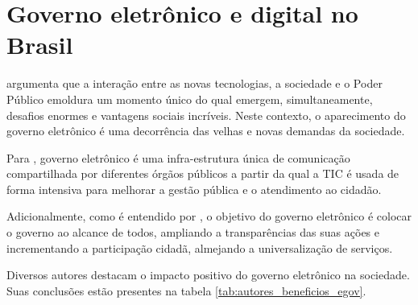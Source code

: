 \chapter{Governo eletrônico e digital no Brasil}

\cite{rover2009introduccao} argumenta que a interação entre as novas tecnologias, a sociedade e o Poder Público emoldura um momento único do qual emergem, simultaneamente, desafios enormes e vantagens sociais incríveis. Neste contexto, o aparecimento do governo eletrônico é uma decorrência das velhas e novas demandas da sociedade.

Para \cite{rover2009introduccao}, governo eletrônico é uma infra-estrutura única de comunicação compartilhada por diferentes órgãos públicos a partir da qual a TIC é usada de forma intensiva para melhorar a gestão pública e o atendimento ao cidadão.

Adicionalmente, como é entendido por \cite{rover2009introduccao}, o objetivo do governo eletrônico é colocar o governo ao alcance de todos, ampliando a transparências das suas ações e incrementando a participação cidadã, almejando a universalização de serviços.

Diversos autores destacam o impacto positivo do governo eletrônico na sociedade. Suas conclusões estão presentes na tabela \ref{tab:autores_beneficios_egov}.


